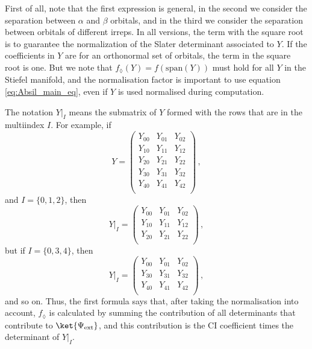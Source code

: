 \documentclass[a4paper,11pt]{article}
\begin{document}
First of all, note that the first expression is general, in the second we consider the separation between $\alpha$ and $\beta$ orbitals, and in the third we consider the separation between orbitals of different irreps.
In all versions, the term with the square root is to guarantee the normalization of the Slater determinant associated to $Y$.
If the coefficients in $Y$ are for an orthonormal set of orbitals, the term in the square root is one.
But we note that $f_\lozenge(Y) = f(\text{span}(Y))$ must hold for all $Y$ in the Stiefel manifold, and the normalisation factor is important to use equation \ref{eq:Absil_main_eq}, even if $Y$ is used normalised during computation.

The notation $Y\big|_I$ means the submatrix of $Y$ formed with the rows that are in the multiindex $I$.
For example, if
\begin{equation}
  Y =
  \begin{pmatrix}
    Y_{00} & Y_{01} & Y_{02}\\
    Y_{10} & Y_{11} & Y_{12}\\
    Y_{20} & Y_{21} & Y_{22}\\
    Y_{30} & Y_{31} & Y_{32}\\
    Y_{40} & Y_{41} & Y_{42}\\
  \end{pmatrix}\,,
\end{equation}
and $I=\{0, 1, 2\}$, then
\begin{equation}
  Y\big|_I =
  \begin{pmatrix}
    Y_{00} & Y_{01} & Y_{02}\\
    Y_{10} & Y_{11} & Y_{12}\\
    Y_{20} & Y_{21} & Y_{22}\\
  \end{pmatrix}\,,
\end{equation}
but if $I=\{0, 3, 4\}$, then
\begin{equation}
  Y\big|_I =
  \begin{pmatrix}
    Y_{00} & Y_{01} & Y_{02}\\
    Y_{30} & Y_{31} & Y_{32}\\
    Y_{40} & Y_{41} & Y_{42}\\
  \end{pmatrix}\,,
\end{equation}
and so on.
Thus, the first formula says that, after taking the normalisation into account, $f_\lozenge$ is calculated by summing the contribution of all determinants that contribute to $\ket{\Psi_\text{ext}}$, and this contribution is the CI coefficient times the determinant of $Y\big|_I$.
\end{document}

